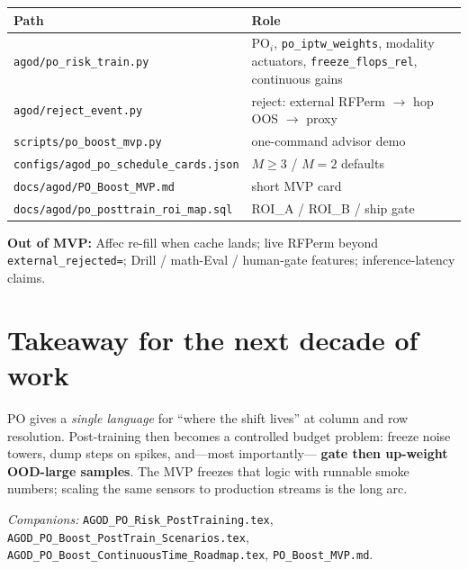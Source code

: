 \documentclass[11pt]{article}
\newcommand{\PO}{\mathrm{PO}}
\begin{document}
\begin{center}
\small
\begin{tabular}{@{}lp{7.5cm}@{}}
\toprule
Path & Role \\
\midrule
\texttt{agod/po\_risk\_train.py}
  & $\PO_i$, \texttt{po\_iptw\_weights}, modality actuators,
    \texttt{freeze\_flops\_rel}, continuous gains \\
\texttt{agod/reject\_event.py}
  & reject: external RFPerm $\to$ hop OOS $\to$ proxy \\
\texttt{scripts/po\_boost\_mvp.py}
  & one-command advisor demo \\
\texttt{configs/agod\_po\_schedule\_cards.json}
  & $M\ge3$ / $M{=}2$ defaults \\
\texttt{docs/agod/PO\_Boost\_MVP.md}
  & short MVP card \\
\texttt{docs/agod/po\_posttrain\_roi\_map.sql}
  & ROI\_A / ROI\_B / ship gate \\
\bottomrule
\end{tabular}
\end{center}

\noindent\textbf{Out of MVP:}
Affec re-fill when cache lands; live RFPerm beyond
\texttt{external\_rejected=}; Drill / math-Eval / human-gate features;
inference-latency claims.

\section{Takeaway for the next decade of work}
\label{sec:take}

PO gives a \emph{single language} for ``where the shift lives'' at
column and row resolution.
Post-training then becomes a controlled budget problem:
freeze noise towers, dump steps on spikes, and---most importantly---
\textbf{gate then up-weight OOD-large samples}.
The MVP freezes that logic with runnable smoke numbers; scaling the
same sensors to production streams is the long arc.

\vspace{1em}
\noindent\textit{Companions:}
\texttt{AGOD\_PO\_Risk\_PostTraining.tex},
\texttt{AGOD\_PO\_Boost\_PostTrain\_Scenarios.tex},
\texttt{AGOD\_PO\_Boost\_ContinuousTime\_Roadmap.tex},
\texttt{PO\_Boost\_MVP.md}.
\end{document}
